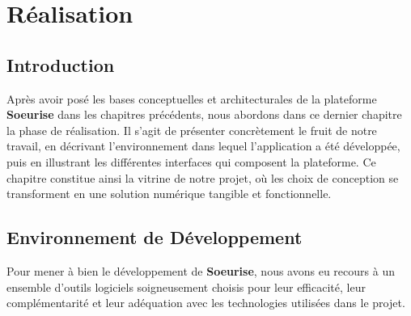 \documentclass[12pt,a4paper]{report}
\begin{document}
	\chapter{Réalisation}
	
	\section{Introduction}
	
	Après avoir posé les bases conceptuelles et architecturales de la plateforme 
	\textbf{Soeurise} dans les chapitres précédents, nous abordons dans ce dernier 
	chapitre la phase de réalisation. Il s'agit de présenter concrètement le fruit 
	de notre travail, en décrivant l'environnement dans lequel l'application a été 
	développée, puis en illustrant les différentes interfaces qui composent la 
	plateforme. Ce chapitre constitue ainsi la vitrine de notre projet, où les 
	choix de conception se transforment en une solution numérique tangible et 
	fonctionnelle.
	
	\section{Environnement de Développement}
	
	Pour mener à bien le développement de \textbf{Soeurise}, nous avons eu 
	recours à un ensemble d'outils logiciels soigneusement choisis pour leur 
	efficacité, leur complémentarité et leur adéquation avec les technologies 
	utilisées dans le projet.
	
\end{document}
